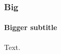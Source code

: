 \documentclass[17pt]{beamer}
\begin{document}
\begin{frame}
\frametitle{Big}
\framesubtitle{Bigger subtitle}
Text.
\end{frame}
\end{document}
